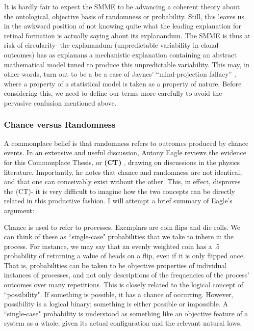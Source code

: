 \documentclass{ut-thesis}
\begin{document}
\begin{NoHyper}
It is hardly fair to expect the SMME to be advancing a coherent theory about the ontological, objective basis of randomness or probability. Still, this leaves us in the awkward position of not knowing quite what the leading explanation for retinal formation is actually saying about its explanandum. The SMME is thus at risk of circularity- the explanandum (unpredictable variability in clonal outcomes) has as explanans a mechanistic explanation containing an abstract mathematical model tuned to produce this unpredictable variability. This may, in other words, turn out to be a be a case of Jaynes' ``mind-projection fallacy'' \cite[p.506]{Jaynes2003}, where a property of a statistical model is taken as a property of nature. Before considering this, we need to define our terms more carefully to avoid the pervasive confusion mentioned above.

\subsubsection{Chance versus Randomness}
A commonplace belief is that randomness refers to outcomes produced by chance events. In an extensive and useful discussion, Antony Eagle reviews the evidence for this Commonplace Thesis, or \textbf{(CT)} \cite{Eagle2018}, drawing on discussions in the physics literature. Importantly, he notes that chance and randomness are not identical, and that one can conceivably exist without the other. This, in effect, disproves the (CT)- it is very difficult to imagine how the two concepts can be directly related in this productive fashion. I will attempt a brief summary of Eagle's argument:

Chance is used to refer to processes. Exemplars are coin flips and die rolls. We can think of these as ``single-case" probabilities that we take to inhere in the process. For instance, we may say that an evenly weighted coin has a .5 probability of returning a value of heads on a flip, even if it is only flipped once. That is, probabilities can be taken to be objective properties of individual instances of processes, and not only descriptions of the frequencies of the process' outcomes over many repetitions. This is closely related to the logical concept of ``possibility". If something is possible, it has a chance of occurring. However, possibility is a logical binary; something is either possible or impossible. A ``single-case" probability is understood as something like an objective feature of a system as a whole, given its actual configuration and the relevant natural laws.  


\end{NoHyper}
\end{document}

